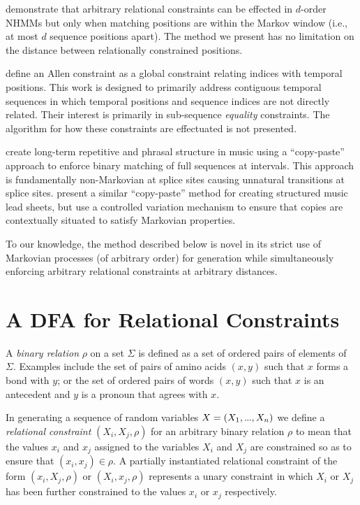 \documentclass[phd,electronic,oneside,twosidetoc,letterpaper,chaptercenter,parttop,lol,lof,lot]{byumsphd}
\newcommand\mydots{\hbox to .75em{.\hss.\hss.}}
\begin{document}
\cite{bodily2018floating} demonstrate that arbitrary relational constraints can be effected in $d$-order NHMMs but only when matching positions are within the Markov window (i.e., at most $d$ sequence positions apart). The method we present has no limitation on the distance between relationally constrained positions.

\cite{roy2016enforcing} define an Allen constraint as a global constraint relating indices with temporal positions. This work is designed to primarily address contiguous temporal sequences in which temporal positions and sequence indices are not directly related. Their interest is primarily in sub-sequence \textit{equality} constraints. The algorithm for how these constraints are effectuated is not presented.

\cite{collins2017computer} create long-term repetitive and phrasal structure in music using a ``copy-paste'' approach to enforce binary matching of full sequences at intervals. This approach is fundamentally non-Markovian at splice sites causing unnatural transitions at splice sites. \cite{pachet2017sampling} present a similar ``copy-paste'' method for creating structured music lead sheets, but use a controlled variation mechanism to ensure that copies are contextually situated to satisfy Markovian properties.

To our knowledge, the method described below is novel in its strict use of Markovian processes (of arbitrary order) for generation while simultaneously enforcing arbitrary relational constraints at arbitrary distances.

\section{A DFA for Relational Constraints}

A \textit{binary relation} $\rho$ on a set $\Sigma$ is defined as a set of ordered pairs of elements of $\Sigma$. Examples include the set of pairs of amino acids $(x,y)$ such that $x$ forms a bond with $y$; or the set of ordered pairs of words $(x,y)$ such that $x$ is an antecedent and $y$ is a pronoun that agrees with $x$.

In generating a sequence of random variables $X=(X_1,\mydots,X_n)$ we define a \textit{relational constraint} $(X_i,X_j,\rho)$ for an arbitrary binary relation $\rho$ to mean that the values $x_i$ and $x_j$ assigned to the variables $X_i$ and $X_j$ are constrained so as to ensure that $(x_i,x_j)\in\rho$. A partially instantiated relational constraint of the form $(x_i,X_j,\rho)$ or $(X_i,x_j,\rho)$ represents a unary constraint in which $X_i$ or $X_j$ has been further constrained to the values $x_i$ or $x_j$ respectively.
\end{document}

